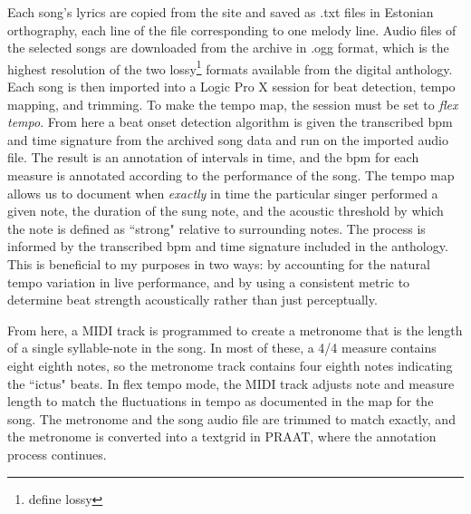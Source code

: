  Each song's lyrics are copied from the site and saved as .txt files in Estonian orthography, each line of the file corresponding to one melody line.  
Audio files of the selected songs are downloaded from the archive in .ogg format, which is the highest resolution of the two lossy\footnote{define lossy} formats available from the digital anthology. Each song is then imported into a Logic Pro X \citep{b131156} session for beat detection, tempo mapping, and trimming. 
To make the tempo map, the session must be set to {\it flex tempo}. From here a beat onset detection algorithm \citep{robertsonBKeeperBeattrackerLive2007} is  given the transcribed bpm and time signature from the archived song data and run on the imported audio file. The result is an annotation of intervals in time, and the bpm for each measure is annotated according to the performance of the song.
The tempo map allows us to document when {\it exactly} in time the particular singer performed a given note, the duration of the sung note, and the acoustic threshold by which the note is defined as ``strong" relative to surrounding notes. The process is informed by the transcribed bpm and time signature included in the anthology. This is beneficial to my purposes in two ways: by accounting for the natural tempo variation in live performance, and by using a consistent metric to determine beat strength acoustically rather than just perceptually.

 From here, a MIDI track is programmed to create a metronome that is the length of a single syllable-note in the song. In most of these, a 4/4 measure contains eight eighth notes, so the metronome track contains four eighth notes indicating the ``ictus" beats. In flex tempo mode, the MIDI track adjusts note and measure length to match the fluctuations in tempo as documented in the map for the song. The metronome and the song audio file are trimmed to match exactly, and the metronome is converted into a textgrid in PRAAT\citep{boersnaPraatDoingPhonetics2022}, where the annotation process continues. 

 


